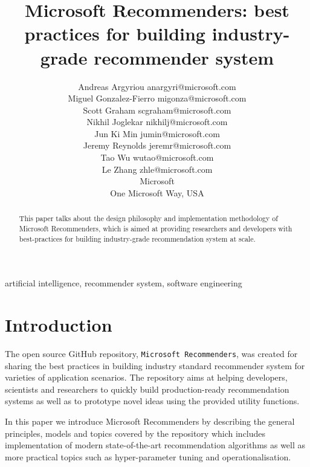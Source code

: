 \documentclass[twoside,11pt]{article}
\begin{document}
\title{Microsoft Recommenders: best practices for building industry-grade recommender system}

\author{\name Andreas Argyriou \email anargyri@microsoft.com \\
  \name Miguel Gonzalez-Fierro \email migonza@microsoft.com \\
  \name Scott Graham \email scgraham@microsoft.com \\
  \name Nikhil Joglekar \email nikhilj@microsoft.com \\
  \name Jun Ki Min \email jumin@microsoft.com \\
  \name Jeremy Reynolds \email jeremr@microsoft.com \\
  \name Tao Wu \email wutao@microsoft.com \\
  \name Le Zhang \email zhle@microsoft.com \\
  \addr Microsoft \\
  One Microsoft Way, USA
}


\maketitle

\begin{abstract}%
  This paper talks about the design philosophy and implementation methodology of Microsoft Recommenders, which is aimed at providing researchers and developers with best-practices for building  industry-grade recommendation system at scale.
\end{abstract}

\begin{keywords}
  artificial intelligence, recommender system, software engineering
\end{keywords}

\section{Introduction}
The open source GitHub repository, \verb|Microsoft Recommenders|, was created for sharing the best practices in building industry standard recommender system for varieties of application scenarios. The repository aims at helping developers, scientists and researchers to quickly build production-ready recommendation systems as well as to prototype novel ideas using the provided utility functions.

In this paper we introduce Microsoft Recommenders by describing the general principles, models and topics covered by the repository which includes implementation of modern state-of-the-art recommendation algorithms as well as more practical topics such as hyper-parameter tuning and operationalisation. 
\end{document}
